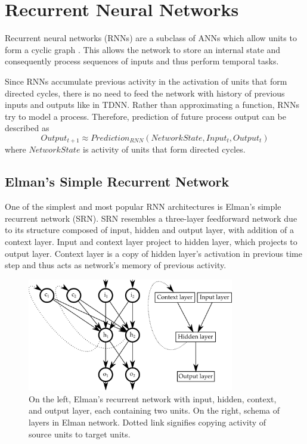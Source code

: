 \documentclass[12pt,oneside]{fithesis2}
\begin{document}
\section{Recurrent Neural Networks}
Recurrent neural networks (RNNs) are a subclass of ANNs which allow units to form a cyclic graph \cite{Williams90anefficient}. This allows the network to store an internal state and consequently process sequences of inputs and thus perform temporal tasks. \par
Since RNNs accumulate previous activity in the activation of units that form directed cycles, there is no need to feed the network with history of previous inputs and outputs like in TDNN. Rather than approximating a function, RNNs try to model a process. Therefore, prediction of future process output can be described as
$$Output_{t+1} \approx Prediction_{RNN}\left(NetworkState, Input_t,Output_t\right)$$
where $NetworkState$ is activity of units that form directed cycles.

\subsection{Elman's Simple Recurrent Network}
One of the simplest and most popular RNN architectures is Elman's  simple recurrent network (SRN). SRN resembles a three-layer feedforward network due to its structure composed of input, hidden and output layer, with addition of a context layer. Input and context layer project to hidden layer, which projects to output layer. Context layer is a copy of hidden layer's activation in previous time step and thus acts as network's memory of previous activity.

	\begin{figure}[ht]
		\centering
		\includegraphics[width=341px]{elman-rnn.png}
		\caption{On the left, Elman's recurrent network with input, hidden, context, and output layer, each containing two units. On the right, schema of layers in Elman network. Dotted link signifies copying activity of source units to target units.}
	\end{figure}
\end{document}
